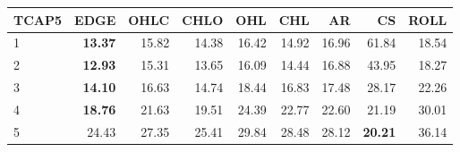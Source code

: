 \begin{table}[ht]
\centering
\begin{tabular}{lrrrrrrrr}
  \hline
TCAP5 & EDGE & OHLC & CHLO & OHL & CHL & AR & CS & ROLL \\ 
  \hline
1 & \textbf{13.37} & 15.82 & 14.38 & 16.42 & 14.92 & 16.96 & 61.84 & 18.54 \\ 
  2 & \textbf{12.93} & 15.31 & 13.65 & 16.09 & 14.44 & 16.88 & 43.95 & 18.27 \\ 
  3 & \textbf{14.10} & 16.63 & 14.74 & 18.44 & 16.83 & 17.48 & 28.17 & 22.26 \\ 
  4 & \textbf{18.76} & 21.63 & 19.51 & 24.39 & 22.77 & 22.60 & 21.19 & 30.01 \\ 
  5 & 24.43 & 27.35 & 25.41 & 29.84 & 28.48 & 28.12 & \textbf{20.21} & 36.14 \\ 
   \hline
\end{tabular}
\end{table}
